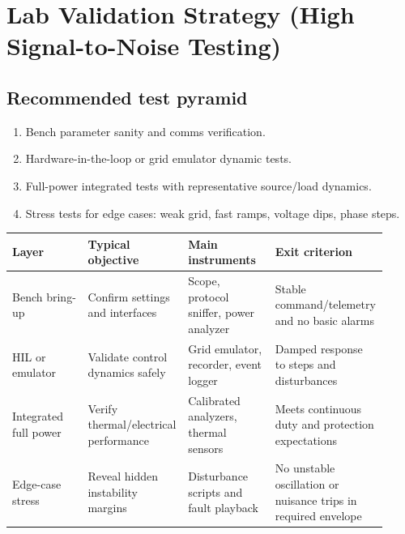 \documentclass[11pt]{article}
\begin{document}
\section{Lab Validation Strategy (High Signal-to-Noise Testing)}

\subsection{Recommended test pyramid}
\begin{enumerate}
  \item Bench parameter sanity and comms verification.
  \item Hardware-in-the-loop or grid emulator dynamic tests.
  \item Full-power integrated tests with representative source/load dynamics.
  \item Stress tests for edge cases: weak grid, fast ramps, voltage dips, phase steps.
\end{enumerate}

\begin{table}[h]
\centering
\begin{tabular}{p{0.2\linewidth}p{0.25\linewidth}p{0.23\linewidth}p{0.24\linewidth}}
\toprule
Layer & Typical objective & Main instruments & Exit criterion \\
\midrule
Bench bring-up & Confirm settings and interfaces & Scope, protocol sniffer, power analyzer & Stable command/telemetry and no basic alarms \\
HIL or emulator & Validate control dynamics safely & Grid emulator, recorder, event logger & Damped response to steps and disturbances \\
Integrated full power & Verify thermal/electrical performance & Calibrated analyzers, thermal sensors & Meets continuous duty and protection expectations \\
Edge-case stress & Reveal hidden instability margins & Disturbance scripts and fault playback & No unstable oscillation or nuisance trips in required envelope \\
\bottomrule
\end{tabular}
\end{table}

\begin{center}
\end{center}
\end{document}
